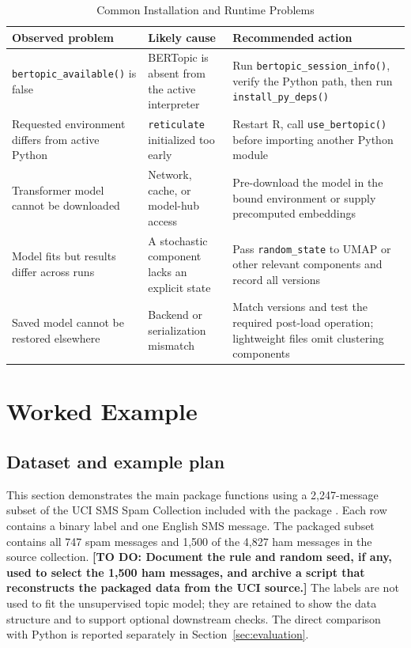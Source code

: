 \documentclass[12pt]{article}
\newcommand{\pkg}[1]{\texttt{#1}}
\newcommand{\code}[1]{\texttt{#1}}
\newcommand{\fcode}[1]{\nolinkurl{#1}}
\newcommand{\todo}[1]{\textbf{[TO DO: #1]}}
\begin{document}
\begin{table}[htbp]
\centering
\caption{Common Installation and Runtime Problems}
\label{tab:diagnostics}
\begin{tabularx}{\linewidth}{>{\raggedright\arraybackslash}p{3.4cm}
                             >{\raggedright\arraybackslash}X
                             >{\raggedright\arraybackslash}p{3.7cm}}
\toprule
Observed problem & Likely cause & Recommended action \\
\midrule
\fcode{bertopic_available()} is false & BERTopic is absent from the active interpreter & Run \fcode{bertopic_session_info()}, verify the Python path, then run \fcode{install_py_deps()} \\
Requested environment differs from active Python & \pkg{reticulate} initialized too early & Restart R, call \code{use\_bertopic()} before importing another Python module \\
Transformer model cannot be downloaded & Network, cache, or model-hub access & Pre-download the model in the bound environment or supply precomputed embeddings \\
Model fits but results differ across runs & A stochastic component lacks an explicit state & Pass \code{random\_state} to UMAP or other relevant components and record all versions \\
Saved model cannot be restored elsewhere & Backend or serialization mismatch & Match versions and test the required post-load operation; lightweight files omit clustering components \\
\bottomrule
\end{tabularx}
\end{table}

\section{Worked Example}

\subsection{Dataset and example plan}

This section demonstrates the main package functions using a 2,247-message subset of the UCI SMS Spam Collection included with the package \citep{sms_spam_collection_228}. Each row contains a binary label and one English SMS message. The packaged subset contains all 747 spam messages and 1,500 of the 4,827 ham messages in the source collection. \todo{Document the rule and random seed, if any, used to select the 1,500 ham messages, and archive a script that reconstructs the packaged data from the UCI source.} The labels are not used to fit the unsupervised topic model; they are retained to show the data structure and to support optional downstream checks. The direct comparison with Python is reported separately in Section~\ref{sec:evaluation}.
\end{document}
